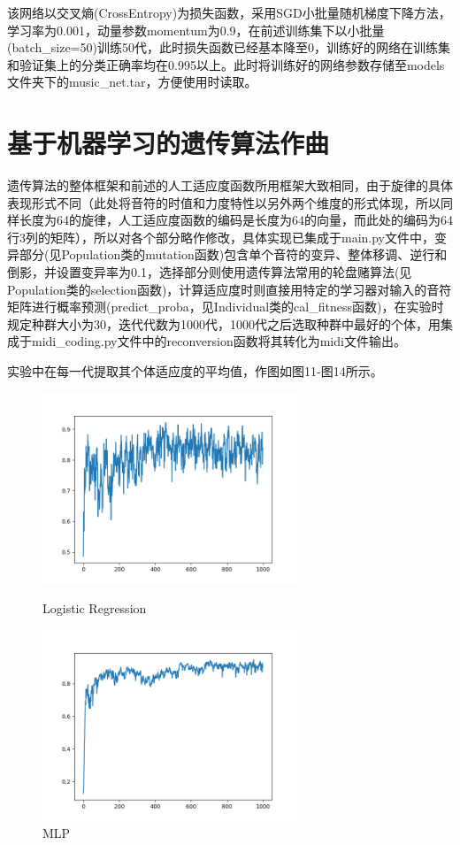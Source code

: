 \documentclass[UTF8,a4paper,10pt]{ctexart}
\begin{document}
    该网络以交叉熵(CrossEntropy)为损失函数，采用SGD小批量随机梯度下降方法，学习率为0.001，动量参数momentum为0.9，在前述训练集下以小批量(batch\_size=50)训练50代，此时损失函数已经基本降至0，训练好的网络在训练集和验证集上的分类正确率均在0.995以上。此时将训练好的网络参数存储至models文件夹下的music\_net.tar，方便使用时读取。



    \section{\textcolor[rgb]{0,0.3,0.6}{基于机器学习的遗传算法作曲}}
    遗传算法的整体框架和前述的人工适应度函数所用框架大致相同，由于旋律的具体表现形式不同（此处将音符的时值和力度特性以另外两个维度的形式体现，所以同样长度为64的旋律，人工适应度函数的编码是长度为64的向量，而此处的编码为64行3列的矩阵），所以对各个部分略作修改，具体实现已集成于main.py文件中，变异部分(见Population类的mutation函数)包含单个音符的变异、整体移调、逆行和倒影，并设置变异率为0.1，选择部分则使用遗传算法常用的轮盘赌算法(见Population类的selection函数)，计算适应度时则直接用特定的学习器对输入的音符矩阵进行概率预测(predict\_proba，见Individual类的cal\_fitness函数)，在实验时规定种群大小为30，迭代代数为1000代，1000代之后选取种群中最好的个体，用集成于midi\_coding.py文件中的reconversion函数将其转化为midi文件输出。

    实验中在每一代提取其个体适应度的平均值，作图如图11-图14所示。

    \begin{figure}[H]
    \begin{minipage}[t]{0.5\linewidth}
    \centering
    \includegraphics[width=3in]{output_logreg.png}
    \caption{Logistic Regression}
    \label{fig:side:a}
    \end{minipage}%
    \begin{minipage}[t]{0.5\linewidth}
    \centering
    \includegraphics[width=3in]{output_mlp.png}
    \caption{MLP}
    \label{fig:side:b}
    \end{minipage}
    \end{figure}
\end{document}
